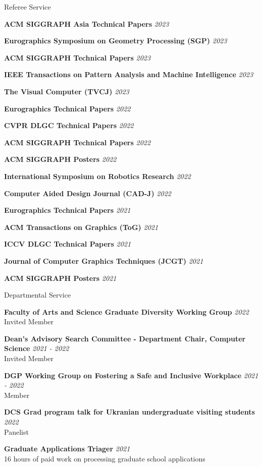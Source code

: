 \documentclass{resume}
\newcommand{\cvitem}[3]{
    {\bf #1} \hfill {\em \small #2} \\ 
    {\small#3 }
}
\newcommand{\cvitemtiny}[2]{
    {\bf #1} \hfill {\em \small #2}
}
\begin{document}
\begin{rSection}{Referee Service}

\cvitemtiny{ACM SIGGRAPH Asia Technical Papers}{2023}

\cvitemtiny{Eurographics Symposium on Geometry Processing (SGP)}{2023}

\cvitemtiny{ACM SIGGRAPH Technical Papers}{2023}

\cvitemtiny{IEEE Transactions on Pattern Analysis and Machine Intelligence}{2023}

\cvitemtiny{The Visual Computer (TVCJ)}{2023}
    
\cvitemtiny{Eurographics Technical Papers}{2022}

\cvitemtiny{CVPR DLGC Technical Papers}{2022}

\cvitemtiny{ACM SIGGRAPH Technical Papers}{2022}

\cvitemtiny{ACM SIGGRAPH Posters}{2022}

\cvitemtiny{International Symposium on Robotics Research}{2022}

\cvitemtiny{Computer Aided Design Journal (CAD-J)}{2022}

\cvitemtiny{Eurographics Technical Papers}{2021}

\cvitemtiny{ACM Transactions on Graphics (ToG)}{2021}

\cvitemtiny{ICCV DLGC Technical Papers}{2021}

\cvitemtiny{Journal of Computer Graphics Techniques (JCGT)}{2021}

\cvitemtiny{ACM SIGGRAPH Posters}{2021}

\end{rSection}

\begin{rSection}{Departmental Service}

    
\cvitem{Faculty of Arts and Science Graduate Diversity Working Group}{2022}{Invited Member}

\cvitem{Dean's Advisory Search Committee -  Department Chair, Computer Science}{2021 - 2022}{Invited Member}

\cvitem{DGP Working Group on Fostering a Safe and Inclusive Workplace}{2021 - 2022}{Member}

\cvitem{DCS Grad program talk for Ukranian undergraduate visiting students}{2022}{Panelist}

\cvitem{Graduate Applications Triager}{2021}{16 hours of paid work on processing graduate school applications}




\end{rSection}
\end{document}
